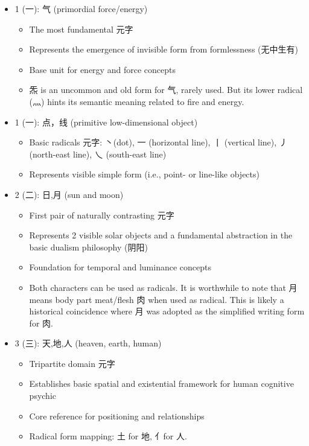 \documentclass[
  11pt,
  letterpaper,
]{article}
\providecommand{\tightlist}{%
  \setlength{\itemsep}{0pt}\setlength{\parskip}{0pt}}
\begin{document}
\begin{itemize}
\item
  1 (一): 气 (primordial force/energy)

  \begin{itemize}
  \tightlist
  \item
    The most fundamental 元字
  \item
    Represents the emergence of invisible form from formlessness
    (无中生有)
  \item
    Base unit for energy and force concepts
  \item
    炁 is an uncommon and old form for 气, rarely used. But its lower
    radical (灬) hints its semantic meaning related to fire and energy.
  \end{itemize}
\item
  1 (一): 点，线 (primitive low-dimensional object)

  \begin{itemize}
  \tightlist
  \item
    Basic radicals 元字: 丶(dot), 一 (horizontal line), 丨 (vertical
    line), 丿 (north-east line), 乀 (south-east line)
  \item
    Represents visible simple form (i.e., point- or line-like objects)
  \end{itemize}
\item
  2 (二): 日,月 (sun and moon)

  \begin{itemize}
  \tightlist
  \item
    First pair of naturally contrasting 元字
  \item
    Represents 2 visible solar objects and a fundamental abstraction in
    the basic dualism philosophy (阴阳)
  \item
    Foundation for temporal and luminance concepts
  \item
    Both characters can be used as radicals. It is worthwhile to note
    that 月 means body part meat/flesh 肉 when used as radical. This is
    likely a historical coincidence where 月 was adopted as the
    simplified writing form for 肉.
  \end{itemize}
\item
  3 (三): 天,地,人 (heaven, earth, human)

  \begin{itemize}
  \tightlist
  \item
    Tripartite domain 元字
  \item
    Establishes basic spatial and existential framework for human
    cognitive psychic
  \item
    Core reference for positioning and relationships
  \item
    Radical form mapping: 土 for 地, 亻for 人.
  \end{itemize}


\end{itemize}
\end{document}
